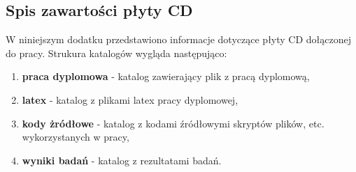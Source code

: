 \begin{appendices}
	\chapter{Spis zawartości płyty CD}
	W niniejszym dodatku przedstawiono informacje dotyczące płyty CD dołączonej do pracy.
 	Strukura katalogów wygląda następująco:
	\begin{enumerate}
		\item \textbf{praca dyplomowa} - katalog zawierający plik z pracą dyplomową,
		\item \textbf{latex} - katalog z plikami latex pracy dyplomowej,
		\item \textbf{kody żródłowe} - katalog z kodami źródłowymi skryptów plików, etc. wykorzystanych w pracy,
		\item \textbf{wyniki badań} - katalog z rezultatami badań.
	\end{enumerate}
\end{appendices}
